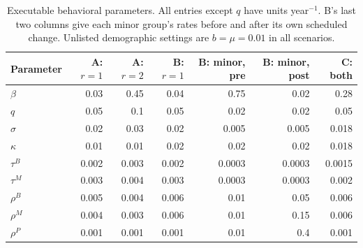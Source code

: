 \begin{table}[!htbp]\centering\small
\caption{Executable behavioral parameters. All entries except $q$ have units year$^{-1}$. B's last two columns give each minor group's rates before and after its own scheduled change. Unlisted demographic settings are $b=\mu=0.01$ in all scenarios.}\label{tab:scenario_params}
\setlength{\tabcolsep}{6pt}\begin{tabular}{lrrrrrr}\toprule
Parameter & A: $r=1$ & A: $r=2$ & B: $r=1$ & B: minor, pre & B: minor, post & C: both\\\midrule
$\beta$ & 0.03 & 0.45 & 0.04 & 0.75 & 0.02 & 0.28\\
$q$ & 0.05 & 0.1 & 0.05 & 0.02 & 0.02 & 0.05\\
$\sigma$ & 0.02 & 0.03 & 0.02 & 0.005 & 0.005 & 0.018\\
$\kappa$ & 0.01 & 0.01 & 0.02 & 0.02 & 0.02 & 0.018\\
$\tau^B$ & 0.002 & 0.003 & 0.002 & 0.0003 & 0.0003 & 0.0015\\
$\tau^M$ & 0.003 & 0.004 & 0.003 & 0.0003 & 0.0003 & 0.002\\
$\rho^B$ & 0.005 & 0.004 & 0.006 & 0.01 & 0.05 & 0.006\\
$\rho^M$ & 0.004 & 0.003 & 0.006 & 0.01 & 0.15 & 0.006\\
$\rho^P$ & 0.001 & 0.001 & 0.001 & 0.01 & 0.4 & 0.001\\
\bottomrule\end{tabular}\end{table}
